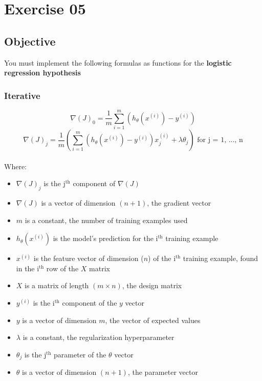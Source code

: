 \chapter{Exercise 05}
%
{}
\makeheaderfilesforbidden

\section*{Objective}
You must implement the following formulas as functions for the \textbf{logistic regression hypothesis}

\subsection*{Iterative}

$$
\nabla(J)_0 = \frac{1}{m}\sum_{i=1}^{m}(h_\theta(x^{(i)}) - y^{(i)})
$$
$$
\nabla(J)_j = \frac{1}{m}\left(\sum_{i=1}^{m}(h_\theta(x^{(i)}) - y^{(i)})x_j^{(i)} + \lambda \theta_j\right) \text{ for j = 1, ..., n}
$$
\\
Where:
\begin{itemize}
  \item $\nabla(J)_j$ is the j$^\text{th}$ component of $\nabla(J)$
  \item $\nabla(J)$ is a vector of dimension $(n + 1)$, the gradient vector
  \item $m$ is a constant, the number of training examples used
  \item $h_\theta(x^{(i)})$ is the model's prediction for the i$^\text{th}$ training example
  \item $x^{(i)}$ is the feature vector of dimension ($n$) of the i$^\text{th}$ training 
  example, found in the i$^\text{th}$ row of the $X$ matrix
  \item $X$ is a matrix of length $(m \times n)$, the design matrix
  \item $y^{(i)}$ is the i$^\text{th}$ component of the $y$ vector
  \item $y$ is a vector of dimension $m$, the vector of expected values
  \item $\lambda$ is a constant, the regularization hyperparameter
  \item $\theta_j$ is the j$^\text{th}$ parameter of the $\theta$ vector
  \item $\theta$ is a vector of dimension $(n + 1)$, the parameter vector
\end{itemize}

